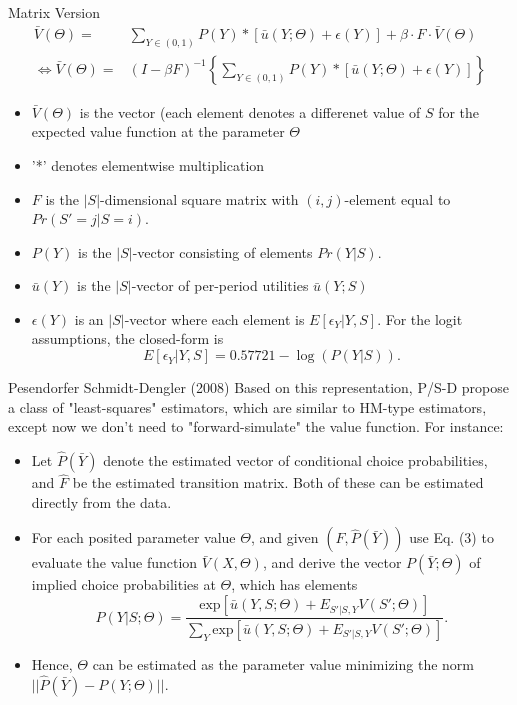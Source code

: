 \documentclass[xcolor=pdftex,dvipsnames,table,mathserif]{beamer}
\begin{document}
\begin{frame}{Matrix Version}
\begin{equation}
\begin{split}
\bar V (\Theta) = & \sum_{Y \in (0,1)} P(Y) * [\bar u (Y; \Theta) + \epsilon(Y)] + \beta \cdot F \cdot \bar V (\Theta) \\
\Leftrightarrow \bar V (\Theta) = & (I - \beta F)^{-1} \left \{ \sum_{Y \in (0,1)} P(Y) * [ \bar u (Y; \Theta) + \epsilon(Y) ] \right \}
\end{split}
\end{equation}
\begin{itemize}
\item  $\bar V(\Theta)$  is the vector (each element denotes a differenet value of $S$ for the expected value function at the parameter $\Theta$ \\
\item '*' denotes elementwise multiplication \\
\item $F$ is the $|S|$-dimensional square matrix with $(i,j)$-element equal to $Pr(S' = j | S = i)$. 
\item $P(Y)$ is the $|S|$-vector consisting of elements $Pr(Y|S)$. 
\item $\bar u (Y)$ is the $|S|$-vector of per-period utilities $\bar u (Y;S)$
\item $\epsilon(Y)$ is an $|S|$-vector where each element is $E[\epsilon_Y | Y,S]$. For the logit assumptions, the closed-form is 
\begin{equation}E[\epsilon_Y|Y,S] = 0.57721- \log(P(Y|S)).\end{equation}
\end{itemize}
\end{frame}

\begin{frame}{Pesendorfer Schmidt-Dengler (2008)}
Based on this representation, P/S-D propose a class of "least-squares" estimators, which are similar to HM-type estimators, except now we don't need to "forward-simulate" the value function. For instance:\\
\begin{itemize}
\item Let $\hat P (\bar Y)$ denote the estimated vector of conditional choice probabilities, and $\hat F$ be the estimated transition matrix. Both of these can be estimated directly from the data.
\item For each posited parameter value $\Theta$, and given $( \hat F, \hat P (\bar Y))$ use Eq. (3) to evaluate the value function $\bar V(X, \Theta)$, and derive the vector $P(\bar Y; \Theta)$ of implied choice probabilities at $\Theta$, which has elements
\begin{equation*}
P(Y|S;\Theta) = \frac {\text{exp} [ \bar u(Y,S; \Theta) + E_{S'|S,Y} V(S';\Theta)]}{\sum_Y \text{exp}[\bar u (Y,S;\Theta) + E_{S'|S,Y} V(S';\Theta)]}. 
\end{equation*}
\item Hence, $\Theta$ can be estimated as the parameter value minimizing the norm $|| \hat P(\bar Y) - P(Y;\Theta)||$.
\end{itemize}
\end{frame}
\end{document}
